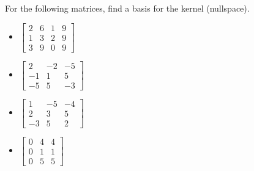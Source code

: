 \documentclass{ximera}
\begin{document}
\begin{exercise}%
    For the following matrices, find a basis for the kernel (nullspace).
    \begin{itemize}
        \item
        $\begin{bmatrix}
            2 & 6 & 1 & 9 \\
            1 & 3 & 2 & 9 \\
            3 & 9 & 0 & 9
        \end{bmatrix}$
        \item
        $\begin{bmatrix}
            2 & -2 & -5 \\
            -1 & 1 & 5 \\
            -5 & 5 & -3
        \end{bmatrix}$
        \item
        $\begin{bmatrix}
            1 & -5 & -4 \\
            2 & 3 & 5 \\
            -3 & 5 & 2
        \end{bmatrix}$
        \item
        $\begin{bmatrix}
            0 & 4 & 4 \\
            0 & 1 & 1 \\
            0 & 5 & 5
        \end{bmatrix}$
    \end{itemize}
\end{exercise}
\end{document}
